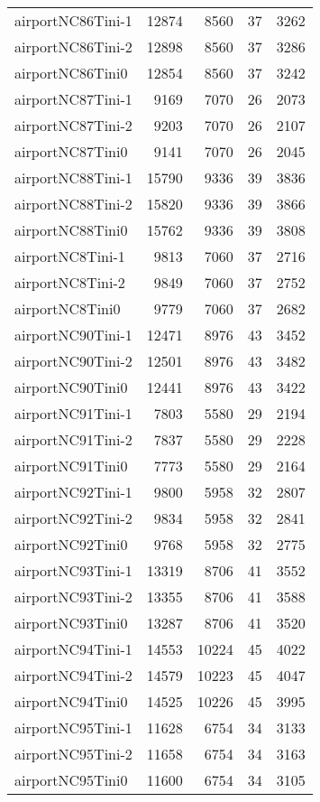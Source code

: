 \begin{longtable}{lrrrr}
airportNC86Tini-1 & 12874 & 8560 & 37 & 3262 \\
airportNC86Tini-2 & 12898 & 8560 & 37 & 3286 \\
airportNC86Tini0 & 12854 & 8560 & 37 & 3242 \\
airportNC87Tini-1 & 9169 & 7070 & 26 & 2073 \\
airportNC87Tini-2 & 9203 & 7070 & 26 & 2107 \\
airportNC87Tini0 & 9141 & 7070 & 26 & 2045 \\
airportNC88Tini-1 & 15790 & 9336 & 39 & 3836 \\
airportNC88Tini-2 & 15820 & 9336 & 39 & 3866 \\
airportNC88Tini0 & 15762 & 9336 & 39 & 3808 \\
airportNC8Tini-1 & 9813 & 7060 & 37 & 2716 \\
airportNC8Tini-2 & 9849 & 7060 & 37 & 2752 \\
airportNC8Tini0 & 9779 & 7060 & 37 & 2682 \\
airportNC90Tini-1 & 12471 & 8976 & 43 & 3452 \\
airportNC90Tini-2 & 12501 & 8976 & 43 & 3482 \\
airportNC90Tini0 & 12441 & 8976 & 43 & 3422 \\
airportNC91Tini-1 & 7803 & 5580 & 29 & 2194 \\
airportNC91Tini-2 & 7837 & 5580 & 29 & 2228 \\
airportNC91Tini0 & 7773 & 5580 & 29 & 2164 \\
airportNC92Tini-1 & 9800 & 5958 & 32 & 2807 \\
airportNC92Tini-2 & 9834 & 5958 & 32 & 2841 \\
airportNC92Tini0 & 9768 & 5958 & 32 & 2775 \\
airportNC93Tini-1 & 13319 & 8706 & 41 & 3552 \\
airportNC93Tini-2 & 13355 & 8706 & 41 & 3588 \\
airportNC93Tini0 & 13287 & 8706 & 41 & 3520 \\
airportNC94Tini-1 & 14553 & 10224 & 45 & 4022 \\
airportNC94Tini-2 & 14579 & 10223 & 45 & 4047 \\
airportNC94Tini0 & 14525 & 10226 & 45 & 3995 \\
airportNC95Tini-1 & 11628 & 6754 & 34 & 3133 \\
airportNC95Tini-2 & 11658 & 6754 & 34 & 3163 \\
airportNC95Tini0 & 11600 & 6754 & 34 & 3105 \\

\end{longtable}
